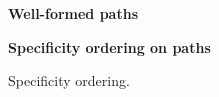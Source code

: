 \begin{figure}[p]
\begin{boxedminipage}{\hsize}
\textbf{Well-formed paths}

	
\textbf{Specificity ordering on paths}

\bigskip



\medskip


\medskip


\medskip



\medskip



\medskip


\smallskip

\end{boxedminipage}
\caption{Specificity ordering.}
\label{fig:rescalc}
\label{fig:order}
\end{figure}

